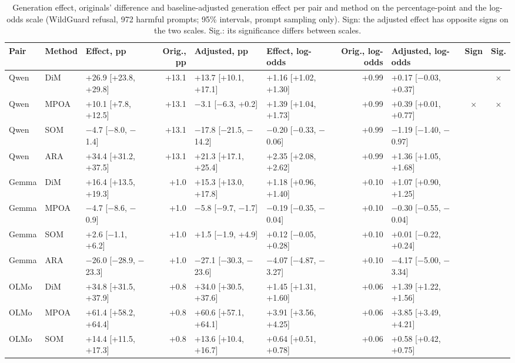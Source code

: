 \begin{table}[t]
\centering\scriptsize
\setlength{\tabcolsep}{3pt}
\caption{Generation effect, originals' difference and baseline-adjusted generation effect per pair and method on the
percentage-point and the log-odds scale (WildGuard refusal, 972 harmful prompts; 95\% intervals, prompt sampling only).
Sign: the adjusted effect has opposite signs on the two scales. Sig.: its significance differs between scales.}
\label{tab:scales}
\begin{tabular}{@{}lllrllrlcc@{}}
\toprule
Pair & Method & Effect, pp & Orig., pp & Adjusted, pp & Effect, log-odds & Orig., log-odds & Adjusted, log-odds & Sign & Sig. \\
\midrule
Qwen & DiM & +26.9 [+23.8, +29.8] & +13.1 & +13.7 [+10.1, +17.1] & +1.16 [+1.02, +1.30] & +0.99 & +0.17 [$-$0.03, +0.37] &  & $\times$ \\
Qwen & MPOA & +10.1 [+7.8, +12.5] & +13.1 & $-$3.1 [$-$6.3, +0.2] & +1.39 [+1.04, +1.73] & +0.99 & +0.39 [+0.01, +0.77] & $\times$ & $\times$ \\
Qwen & SOM & $-$4.7 [$-$8.0, $-$1.4] & +13.1 & $-$17.8 [$-$21.5, $-$14.2] & $-$0.20 [$-$0.33, $-$0.06] & +0.99 & $-$1.19 [$-$1.40, $-$0.97] &  &  \\
Qwen & ARA & +34.4 [+31.2, +37.5] & +13.1 & +21.3 [+17.1, +25.4] & +2.35 [+2.08, +2.62] & +0.99 & +1.36 [+1.05, +1.68] &  &  \\
\midrule
Gemma & DiM & +16.4 [+13.5, +19.3] & +1.0 & +15.3 [+13.0, +17.8] & +1.18 [+0.96, +1.40] & +0.10 & +1.07 [+0.90, +1.25] &  &  \\
Gemma & MPOA & $-$4.7 [$-$8.6, $-$0.9] & +1.0 & $-$5.8 [$-$9.7, $-$1.7] & $-$0.19 [$-$0.35, $-$0.04] & +0.10 & $-$0.30 [$-$0.55, $-$0.04] &  &  \\
Gemma & SOM & +2.6 [$-$1.1, +6.2] & +1.0 & +1.5 [$-$1.9, +4.9] & +0.12 [$-$0.05, +0.28] & +0.10 & +0.01 [$-$0.22, +0.24] &  &  \\
Gemma & ARA & $-$26.0 [$-$28.9, $-$23.3] & +1.0 & $-$27.1 [$-$30.3, $-$23.6] & $-$4.07 [$-$4.87, $-$3.27] & +0.10 & $-$4.17 [$-$5.00, $-$3.34] &  &  \\
\midrule
OLMo & DiM & +34.8 [+31.5, +37.9] & +0.8 & +34.0 [+30.5, +37.6] & +1.45 [+1.31, +1.60] & +0.06 & +1.39 [+1.22, +1.56] &  &  \\
OLMo & MPOA & +61.4 [+58.2, +64.4] & +0.8 & +60.6 [+57.1, +64.1] & +3.91 [+3.56, +4.25] & +0.06 & +3.85 [+3.49, +4.21] &  &  \\
OLMo & SOM & +14.4 [+11.5, +17.3] & +0.8 & +13.6 [+10.4, +16.7] & +0.64 [+0.51, +0.78] & +0.06 & +0.58 [+0.42, +0.75] &  &  \\

\end{tabular}
\end{table}
